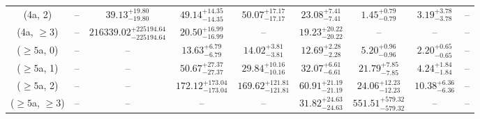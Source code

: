 \begin{table}[h!]
{\begin{tabular}{ccccccccc}
	(4a, 2) & -- & $39.13^{+ 19.80 }_{- 19.80 }$ & $49.14^{+ 14.35 }_{- 14.35 }$ & $50.07^{+ 17.17 }_{- 17.17 }$ & $23.08^{+ 7.41 }_{- 7.41 }$ & $1.45^{+ 0.79 }_{- 0.79 }$ & $3.19^{+ 3.78 }_{- 3.78 }$ & -- \\[0.5ex] 
	(4a, $\ge3$) & -- & $216339.02^{+ 225194.64 }_{- 225194.64 }$ & $20.50^{+ 16.99 }_{- 16.99 }$ & -- & $19.23^{+ 20.22 }_{- 20.22 }$ & -- & -- & -- \\[0.5ex] 
	($\ge5$a, 0) & -- & -- & $13.63^{+ 6.79 }_{- 6.79 }$ & $14.02^{+ 3.81 }_{- 3.81 }$ & $12.69^{+ 2.28 }_{- 2.28 }$ & $5.20^{+ 0.96 }_{- 0.96 }$ & $2.20^{+ 0.65 }_{- 0.65 }$ & -- \\[0.5ex] 
	($\ge5$a, 1) & -- & -- & $50.67^{+ 27.37 }_{- 27.37 }$ & $29.84^{+ 10.16 }_{- 10.16 }$ & $32.07^{+ 6.61 }_{- 6.61 }$ & $21.79^{+ 7.85 }_{- 7.85 }$ & $4.24^{+ 1.84 }_{- 1.84 }$ & -- \\[0.5ex] 
	($\ge5$a, 2) & -- & -- & $172.12^{+ 173.04 }_{- 173.04 }$ & $169.62^{+ 121.81 }_{- 121.81 }$ & $60.91^{+ 21.19 }_{- 21.19 }$ & $24.06^{+ 12.23 }_{- 12.23 }$ & $10.38^{+ 6.36 }_{- 6.36 }$ & -- \\[0.5ex] 
	($\ge5$a, $\ge3$) & -- & -- & -- & -- & $31.82^{+ 24.63 }_{- 24.63 }$ & $551.51^{+ 579.32 }_{- 579.32 }$ & -- & -- \\[0.5ex] 
	\hline
	\hline
\end{tabular}}
\end{table}
